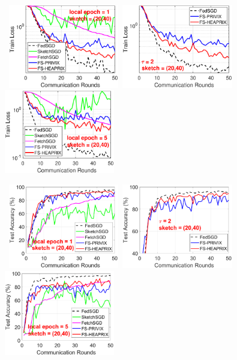 \documentclass[11pt]{article}
\begin{document}
\begin{figure}[h]
	\begin{center}
		\mbox{%
		\includegraphics[width=1.9in]{MNIST_figures/local1_sketch20_iid0_train_loss.eps}%
		\includegraphics[width=1.9in]{MNIST_figures/local2_sketch20_iid0_train_loss.eps}%
		\includegraphics[width=1.9in]{MNIST_figures/local5_sketch20_iid0_train_loss.eps} }
		
		\mbox{%
		\includegraphics[width=1.9in]{MNIST_figures/local1_sketch20_iid0_test_acc.eps} %
		\includegraphics[width=1.9in]{MNIST_figures/local2_sketch20_iid0_test_acc.eps} %
		\includegraphics[width=1.9in]{MNIST_figures/local5_sketch20_iid0_test_acc.eps}
		}
		

\end{center}
\end{figure}
\end{document}
